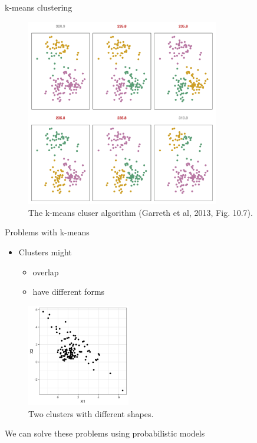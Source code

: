 \documentclass[10pt]{beamer}
\begin{document}
\begin{frame}{k-means clustering}

\begin{figure}[h]
\centering
\includegraphics[width=0.75\textwidth]{fig/fig_10_7_kmeans_local_modes.png}
\caption{The k-means cluser algorithm (Garreth et al, 2013, Fig. 10.7).}
\end{figure}

\end{frame}


\begin{frame}{Problems with k-means}

\begin{itemize}
\item Clusters might
\begin{itemize}
\item overlap
\item have different forms
\end{itemize}
\end{itemize}

\begin{figure}[h]
\centering
\includegraphics[width=0.4\textwidth]{fig/mix_models.png}
\caption{Two clusters with different shapes.}
\end{figure}

\pause
We can solve these problems using {\color{uured} probabilistic models}

\end{frame}
\end{document}
